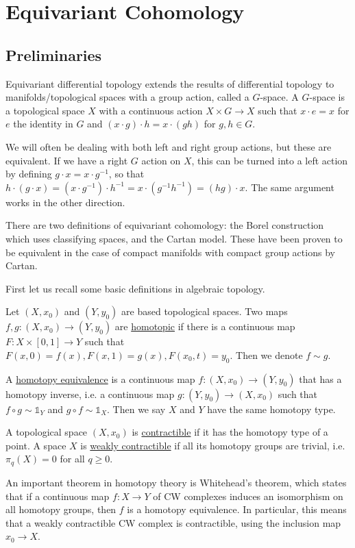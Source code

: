 \chapter{Equivariant Cohomology}
\label{chapter2}

\section{Preliminaries}
Equivariant differential topology extends the results of differential topology
to manifolds/topological spaces with a group action, called a $G$-space. A
$G$-space is a topological space $X$ with a continuous action $X\times G \to X$ 
such that $x\cdot e = x$ for $e$ the identity in  $G$ and $(x\cdot g) \cdot h =
x\cdot (gh)$ for $g,h\in G$. 

We will often be dealing with both left and right group actions, but these are
equivalent. If we have a right $G$ action on $X$, this can be turned into a left
action by defining  $g \cdot x = x \cdot g^{-1}$, so that $h\cdot (g\cdot x) =
(x\cdot g^{-1})\cdot h^{-1} = x\cdot (g^{-1}h^{-1}) = (hg)\cdot x$. The same
argument works in the other direction.


There are two definitions of equivariant
cohomology: the Borel construction which uses classifying spaces, and the Cartan model.
These have been proven to be equivalent in the case of compact manifolds with
compact group actions by Cartan. %

First let us recall some basic definitions in algebraic topology.
\begin{defn}
	Let $(X,x_0)$ and $(Y,y_0)$ are based topological spaces. Two maps
	$f,g:(X,x_0)\to(Y,y_0)$ are \underline{homotopic} if there is a continuous
	map $F:X\times [0,1]\to Y$ such that
	$F(x,0)=f(x),F(x,1)=g(x),F(x_0,t)=y_0$. Then we denote $f\sim g$.

	A \underline{homotopy equivalence} is a continuous map $f:(X,x_0)\to(Y,y_0)$
	that has a homotopy inverse, i.e. a continuous map $g:(Y,y_0)\to(X,x_0)$
	such that $f\circ g \sim \mathbb{1}_Y$ and $g\circ f \sim \mathbb{1}_X$.
	Then we say $X$ and  $Y$ have the same homotopy type.

	A topological space $(X,x_0)$ is \underline{contractible} if it has the
	homotopy type of a point. 
	A space $X$ is \underline{weakly contractible} if all its homotopy groups
	are trivial, i.e.  $\pi_q(X)=0$ for all  $q\geq 0$. 
\end{defn}
An important theorem in homotopy theory is Whitehead's theorem, which states
that if a continuous map $f:X\to Y$ of CW complexes induces an isomorphism on
all homotopy groups, then  $f$ is a homotopy equivalence. In particular, this
means that a weakly contractible CW complex is contractible, using the inclusion
map $x_0 \to X$.

